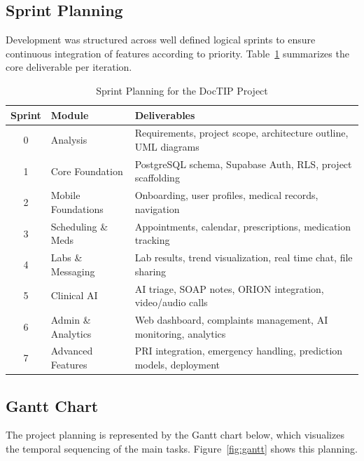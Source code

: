 \documentclass[12pt,a4paper,oneside]{report}
\begin{document}
\subsection{Sprint Planning}

Development was structured across well defined logical sprints to ensure continuous integration of features according to priority. Table~\ref{tab:sprints} summarizes the core deliverable per iteration.

\begin{table}[H]
    \centering
    \renewcommand{\arraystretch}{1.4}
    \caption{Sprint Planning for the DocTIP Project}
    \label{tab:sprints}
    \small
\begin{tabular}{|c|l|p{9cm}|}
\hline
        \textbf{Sprint} & \textbf{Module} & \textbf{Deliverables} \\
\hline
        0 & Analysis            & Requirements, project scope, architecture outline, UML diagrams \\
\hline
        1 & Core Foundation     & PostgreSQL schema, Supabase Auth, RLS, project scaffolding \\
\hline
        2 & Mobile Foundations  & Onboarding, user profiles, medical records, navigation \\
\hline
        3 & Scheduling \& Meds  & Appointments, calendar, prescriptions, medication tracking \\
\hline
        4 & Labs \& Messaging   & Lab results, trend visualization, real time chat, file sharing \\
\hline
        5 & Clinical AI         & AI triage, SOAP notes, ORION integration, video/audio calls \\
\hline
        6 & Admin \& Analytics  & Web dashboard, complaints management, AI monitoring, analytics \\
\hline
        7 & Advanced Features   & PRI integration, emergency handling, prediction models, deployment \\
\hline
    \end{tabular}
\end{table}

\clearpage
\subsection{Gantt Chart}

The project planning is represented by the Gantt chart below, which visualizes the temporal sequencing of the main tasks. Figure~\ref{fig:gantt} shows this planning.
\end{document}
